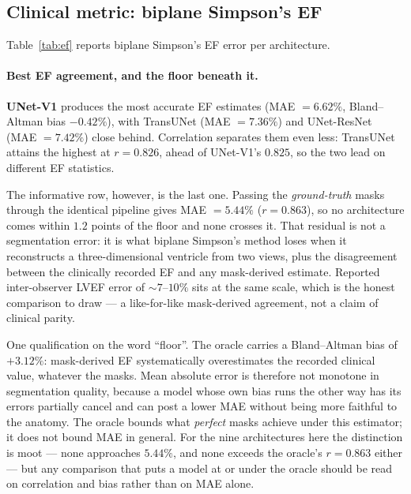 

\subsection{Clinical metric: biplane Simpson's EF}
\label{sec:results-clinical}

Table~\ref{tab:ef} reports biplane Simpson's EF error per architecture.



\paragraph{Best EF agreement, and the floor beneath it.}
\textbf{UNet-V1} produces the most accurate EF estimates
(MAE $= 6.62\%$, Bland--Altman bias
$-0.42\%$), with TransUNet
(MAE $= 7.36\%$) and UNet-ResNet
(MAE $= 7.42\%$) close behind. Correlation separates them even
less: TransUNet attains the highest at $r = 0.826$, ahead of
UNet-V1's $0.825$, so the two lead on different EF statistics.

The informative row, however, is the last one. Passing the \emph{ground-truth}
masks through the identical pipeline gives MAE $= 5.44\%$ ($r = 0.863$), so no
architecture comes within $1.2$ points of the floor and none crosses it. That
residual is not a segmentation error: it is what biplane Simpson's method loses
when it reconstructs a three-dimensional ventricle from two views, plus the
disagreement between the clinically recorded EF and any mask-derived estimate.
Reported inter-observer LVEF error of $\sim$$7$--$10\%$ sits at the same scale,
which is the honest comparison to draw --- a like-for-like mask-derived
agreement, not a claim of clinical parity.

One qualification on the word ``floor''. The oracle carries a Bland--Altman
bias of $+3.12\%$: mask-derived EF systematically overestimates the recorded
clinical value, whatever the masks. Mean absolute error is therefore not
monotone in segmentation quality, because a model whose own bias runs the other
way has its errors partially cancel and can post a lower MAE without being more
faithful to the anatomy. The oracle bounds what \emph{perfect} masks achieve
under this estimator; it does not bound MAE in general. For the nine
architectures here the distinction is moot --- none approaches $5.44\%$, and
none exceeds the oracle's $r = 0.863$ either --- but any comparison that puts a
model at or under the oracle should be read on correlation and bias rather than
on MAE alone.


